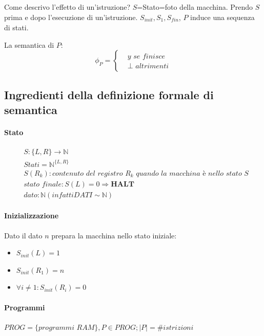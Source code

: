\documentclass{article}
\begin{document}
Come descrivo l'effetto di un'istruzione? $S$=Stato=foto della macchina. Prendo $S$ prima e dopo l'esecuzione di un'istruzione.
$S_{\textit{init}}, S_1, S_{\textit{fin}}$, $P$ induce una sequenza di stati.



La semantica di $P$:
\begin{displaymath}
	\phi_{P} =
	\begin{cases}
		&y \textit{ se finisce} \\
		&\perp \textit{ altrimenti}
	\end{cases}
\end{displaymath}


\subsection{Ingredienti della definizione formale di semantica}
\paragraph{Stato}
\begin{displaymath}
	\begin{split}
	& S:\{L,R\} \rightarrow \mathbb{N} \\
	& \textit{Stati} = \mathbb{N}^{\{L,R\}} \\
	& S(R_k): \textit{contenuto del registro $R_k$ quando la macchina è nello stato $S$} \\
	& \textit{stato finale}: S(L)=0 \Rightarrow \textbf{HALT} \\
	& \textit{dato}: \mathbb{N} (infatti \textit{DATI} \sim \mathbb{N})
	\end{split}
\end{displaymath}


\paragraph{Inizializzazione}
Dato il dato $n$ prepara la macchina nello stato iniziale:
\begin{itemize}
	\item $S_{\textit{init}}(L)=1$
	\item $S_{\textit{init}}(R_1)=n$
	\item $\forall i \neq 1 : S_{\textit{init}}(R_i)=0$
\end{itemize}

\paragraph{Programmi}
	$PROG=\{\textit{programmi RAM}\}, P \in PROG; |P|= \#\textit{istrizioni}$
	
\end{document}
